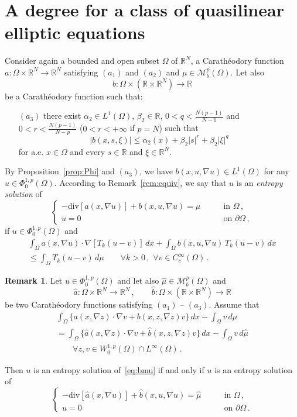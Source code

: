 \documentclass[twoside,reqno]{amsart}
\numberwithin{equation}{section}
\theoremstyle{definition}
\newtheorem{rem}[thm]{Remark}
\newcommand{\R}{\mathbb{R}}
\begin{document}

\section{A degree for a class of quasilinear elliptic equations}
\label{sect:degree}
%
Consider again a bounded and open subset $\Omega$ of $\R^N$,
a Carath\'eodory function $a:\Omega\times\R^N\rightarrow\R^N$ 
satisfying $(a_1)$ and $(a_2)$ and $\mu\in\mathcal{M}_b^p(\Omega)$.
Let also 
\[
b:\Omega\times(\R\times\R^N)\rightarrow\R
\]
be a Carath\'eodory function such that:
\begin{itemize}
\item[$(a_3)$]
there exist $\alpha_2\in L^1(\Omega)$, $\beta_2\in\R$,
$0<q<\frac{N(p-1)}{N-1}$ and $0<r<\frac{N(p-1)}{N-p}$
($0<r<+\infty$ if $p=N$) such that
\[
|b(x,s,\xi)|\leq \alpha_2(x) + \beta_2|s|^r +\beta_2|\xi|^q
\]
for a.e. $x\in \Omega$ and every $s\in\R$ and $\xi\in\R^N$.
\end{itemize}
By Proposition~\ref{prop:Phi} and $(a_3)$, we have
$b(x,u,\nabla u)\in L^1(\Omega)$ for any 
$u\in \Phi^{1,p}_0(\Omega)$.
According to Remark~\ref{rem:equiv}, we say that
$u$ is an \emph{entropy solution} of
\begin{equation}
\label{eq:bmu}
\begin{cases}
- \mathrm{div}[a(x,\nabla u)] + b(x,u,\nabla u)=\mu 
&\qquad\text{in $\Omega$}\,,\\
u=0
&\qquad\text{on $\partial\Omega$}\,,
\end{cases}
\end{equation}
if $u\in \Phi^{1,p}_0(\Omega)$ and
\begin{multline*}
\int_\Omega a(x,\nabla u)\cdot\nabla [T_k(u - v)]\,dx
+ \int_\Omega b(x,u,\nabla u)\,T_k(u - v)\,dx \\
\leq \int_\Omega T_k(u-v)\,d\mu
\qquad\forall k>0\,,\,\, \forall v\in C^{\infty}_c(\Omega)\,.
\end{multline*}
%
\begin{rem}
\label{rem:dec}
Let $u\in \Phi^{1,p}_0(\Omega)$
and let also $\hat{\mu}\in\mathcal{M}_b^p(\Omega)$ and
\[
\hat{a}:\Omega\times\R^N\rightarrow\R^N\,,\qquad
\hat{b}:\Omega\times(\R\times\R^N)\rightarrow\R
\]
be two Carath\'eodory functions satisfying $(a_1)$ -- $(a_3)$.
Assume that
\begin{multline*}
\int_{\Omega} \{a(x,\nabla z)\cdot\nabla v + b(x,z,\nabla z)v\}\,dx
- \int_\Omega v\,d\mu \\
= \int_{\Omega} \{\hat{a}(x,\nabla z)\cdot\nabla v 
+ \hat{b}(x,z,\nabla z)v\}\,dx 
- \int_\Omega v\,d\hat{\mu}  \\
\qquad \forall z, v\in W^{1,p}_0(\Omega)\cap L^{\infty}(\Omega)\,.
\end{multline*}
\par
Then $u$ is an entropy solution of~\eqref{eq:bmu} if and only if
$u$ is an entropy solution of
\[
\begin{cases}
- \mathrm{div}[\hat{a}(x,\nabla u)] 
+ \hat{b}(x,u,\nabla u)=\hat{\mu} 
&\qquad\text{in $\Omega$}\,,\\
u=0
&\qquad\text{on $\partial\Omega$}\,.
\end{cases}
\]
\end{rem}
\end{document}
